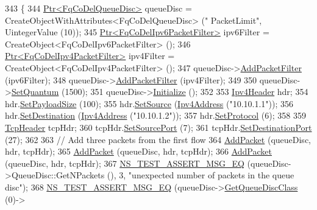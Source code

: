 \begin{DoxyCode}
343 \{
344   \hyperlink{classns3_1_1Ptr}{Ptr<FqCoDelQueueDisc>} queueDisc = CreateObjectWithAttributes<FqCoDelQueueDisc> (\textcolor{stringliteral}{"
      PacketLimit"}, UintegerValue (10));
345   \hyperlink{classns3_1_1Ptr}{Ptr<FqCoDelIpv6PacketFilter>} ipv6Filter = 
      CreateObject<FqCoDelIpv6PacketFilter> ();
346   \hyperlink{classns3_1_1Ptr}{Ptr<FqCoDelIpv4PacketFilter>} ipv4Filter = 
      CreateObject<FqCoDelIpv4PacketFilter> ();
347   queueDisc->\hyperlink{classns3_1_1QueueDisc_a45efdc512f64cb8e0d57ad4f208ed4b7}{AddPacketFilter} (ipv6Filter);
348   queueDisc->\hyperlink{classns3_1_1QueueDisc_a45efdc512f64cb8e0d57ad4f208ed4b7}{AddPacketFilter} (ipv4Filter);
349 
350   queueDisc->\hyperlink{classns3_1_1FqCoDelQueueDisc_a3d7f222490f1df11be26ee4b3f0dfce5}{SetQuantum} (1500);
351   queueDisc->\hyperlink{classns3_1_1Object_af4411cb29971772fcd09203474a95078}{Initialize} ();
352 
353   \hyperlink{classns3_1_1Ipv4Header}{Ipv4Header} hdr;
354   hdr.\hyperlink{classns3_1_1Ipv4Header_a3e961181f7839619a68bb7a2dcd483b0}{SetPayloadSize} (100);
355   hdr.\hyperlink{classns3_1_1Ipv4Header_af3c8c140e302ec4aa1dc885ce1dcc070}{SetSource} (\hyperlink{classns3_1_1Ipv4Address}{Ipv4Address} (\textcolor{stringliteral}{"10.10.1.1"}));
356   hdr.\hyperlink{classns3_1_1Ipv4Header_a154e584fb5418de7a5ce34dbb852de02}{SetDestination} (\hyperlink{classns3_1_1Ipv4Address}{Ipv4Address} (\textcolor{stringliteral}{"10.10.1.2"}));
357   hdr.\hyperlink{classns3_1_1Ipv4Header_aca424df8132b7717fb4c315fcb4ce4bf}{SetProtocol} (6);
358 
359   \hyperlink{classns3_1_1TcpHeader}{TcpHeader} tcpHdr;
360   tcpHdr.\hyperlink{classns3_1_1TcpHeader_aceb2630b3d43118ee576aec58f55a0ff}{SetSourcePort} (7);
361   tcpHdr.\hyperlink{classns3_1_1TcpHeader_a3259c06373ba4261eaaaed0cbf40cad3}{SetDestinationPort} (27);
362 
363   \textcolor{comment}{// Add three packets from the first flow}
364   \hyperlink{classFqCoDelQueueDiscTCPFlowsSeparation_ae3d3e59d786d4cc53a9140ac1a870a4b}{AddPacket} (queueDisc, hdr, tcpHdr);
365   \hyperlink{classFqCoDelQueueDiscTCPFlowsSeparation_ae3d3e59d786d4cc53a9140ac1a870a4b}{AddPacket} (queueDisc, hdr, tcpHdr);
366   \hyperlink{classFqCoDelQueueDiscTCPFlowsSeparation_ae3d3e59d786d4cc53a9140ac1a870a4b}{AddPacket} (queueDisc, hdr, tcpHdr);
367   \hyperlink{group__testing_ga2a9d78cffb3db8e867c35fff0b698cf5}{NS\_TEST\_ASSERT\_MSG\_EQ} (queueDisc->QueueDisc::GetNPackets (), 3, \textcolor{stringliteral}{"unexpected number
       of packets in the queue disc"});
368   \hyperlink{group__testing_ga2a9d78cffb3db8e867c35fff0b698cf5}{NS\_TEST\_ASSERT\_MSG\_EQ} (queueDisc->\hyperlink{classns3_1_1QueueDisc_a584d228f7bff3f754d32793a38134556}{GetQueueDiscClass} (0)->

\end{DoxyCode}
